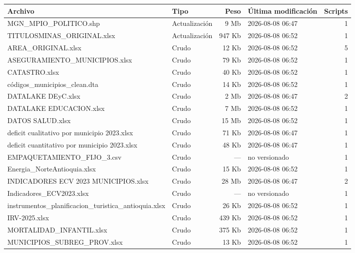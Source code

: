 \begin{tabularx}{\linewidth}{>{\raggedright\arraybackslash}X l r l r}
\toprule
\textbf{Archivo} & \textbf{Tipo} & \textbf{Peso} & \textbf{Última modificación} & \textbf{Scripts} \\
\midrule
MGN\_\allowbreak{}MPIO\_\allowbreak{}POLITICO.shp & Actualización & 9 Mb & 2026-08-08 06:47 & 1 \\
TITULOSMINAS\_\allowbreak{}ORIGINAL.xlsx & Actualización & 947 Kb & 2026-08-08 06:52 & 1 \\
AREA\_\allowbreak{}ORIGINAL.xlsx & Crudo & 12 Kb & 2026-08-08 06:52 & 5 \\
ASEGURAMIENTO\_\allowbreak{}MUNICIPIOS.xlsx & Crudo & 79 Kb & 2026-08-08 06:52 & 1 \\
CATASTRO.xlsx & Crudo & 40 Kb & 2026-08-08 06:52 & 1 \\
códigos\_\allowbreak{}municipios\_\allowbreak{}clean.dta & Crudo & 14 Kb & 2026-08-08 06:52 & 1 \\
DATALAKE DEyC.xlsx & Crudo & 2 Mb & 2026-08-08 06:47 & 2 \\
DATALAKE EDUCACION.xlsx & Crudo & 7 Mb & 2026-08-08 06:52 & 1 \\
DATOS SALUD.xlsx & Crudo & 15 Mb & 2026-08-08 06:52 & 1 \\
deficit cualitativo por municipio 2023.xlsx & Crudo & 71 Kb & 2026-08-08 06:47 & 1 \\
deficit cuantitativo por municipio 2023.xlsx & Crudo & 48 Kb & 2026-08-08 06:47 & 1 \\
EMPAQUETAMIENTO\_\allowbreak{}FIJO\_\allowbreak{}3.csv & Crudo & — & no versionado & 1 \\
Energia\_\allowbreak{}NorteAntioquia.xlsx & Crudo & 15 Kb & 2026-08-08 06:52 & 1 \\
INDICADORES ECV 2023 MUNICIPIOS.xlsx & Crudo & 28 Mb & 2026-08-08 06:47 & 2 \\
Indicadores\_\allowbreak{}ECV2023.xlsx & Crudo & — & no versionado & 1 \\
instrumentos\_\allowbreak{}planificacion\_\allowbreak{}turistica\_\allowbreak{}antioquia.xlsx & Crudo & 26 Kb & 2026-08-08 06:52 & 1 \\
IRV-2025.xlsx & Crudo & 439 Kb & 2026-08-08 06:52 & 1 \\
MORTALIDAD\_\allowbreak{}INFANTIL.xlsx & Crudo & 375 Kb & 2026-08-08 06:52 & 1 \\
MUNICIPIOS\_\allowbreak{}SUBREG\_\allowbreak{}PROV.xlsx & Crudo & 13 Kb & 2026-08-08 06:52 & 1 \\

\end{tabularx}
